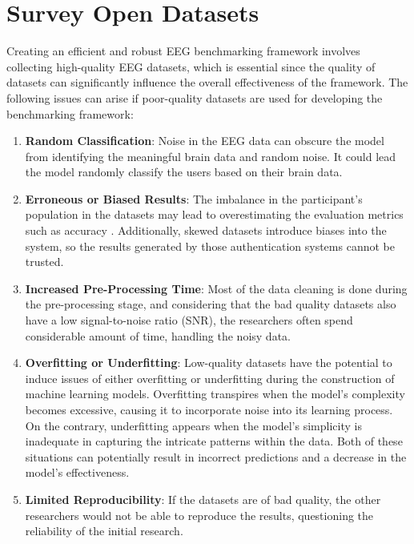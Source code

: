 \section{Survey Open Datasets}
\label{sec:Solution Approach:Survey Open Datasets}
Creating an efficient and robust EEG benchmarking framework involves collecting high-quality EEG datasets, which is essential since the quality of datasets can significantly influence the overall effectiveness of the framework. The following issues can arise if poor-quality datasets are used for developing the benchmarking framework: 
\begin{enumerate}
\item \textbf{Random Classification}: Noise in the EEG data can obscure the model from identifying the meaningful brain data and random noise. It could lead the model randomly classify the users based on their brain data.
    
\item \textbf{Erroneous or Biased Results}: The imbalance in the participant's population in the datasets may lead to overestimating the evaluation metrics such as accuracy \cite{sugrim_robust_metrics}. Additionally, skewed datasets introduce biases into the system, so the results generated by those authentication systems cannot be trusted.    

\item \textbf{Increased Pre-Processing Time}: Most of the data cleaning is done during the pre-processing stage, and considering that the bad quality datasets also have a low signal-to-noise ratio (SNR), the researchers often spend considerable amount of time, handling the noisy data.

\item \textbf{Overfitting or Underfitting}: Low-quality datasets have the potential to induce issues of either overfitting or underfitting during the construction of machine learning models. Overfitting transpires when the model's complexity becomes excessive, causing it to incorporate noise into its learning process. On the contrary, underfitting appears when the model's simplicity is inadequate in capturing the intricate patterns within the data. Both of these situations can potentially result in incorrect predictions and a decrease in the model's effectiveness.

\item \textbf{Limited Reproducibility}: If the datasets are of bad quality, the other researchers would not be able to reproduce the results, questioning the reliability of the initial research. 
\end{enumerate}

